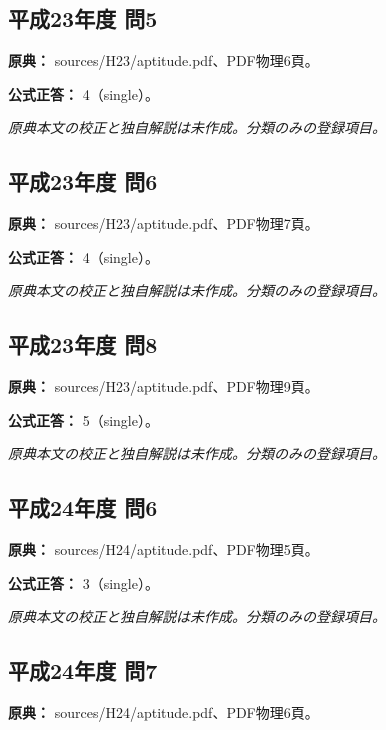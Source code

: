 \subsection{平成23年度 問5}
\label{q:h23-reg-apt-05}

\noindent\textbf{原典：} sources/H23/aptitude.pdf、PDF物理6頁。

\textbf{公式正答：} 4（single）。

\par\textit{原典本文の校正と独自解説は未作成。分類のみの登録項目。}

\subsection{平成23年度 問6}
\label{q:h23-reg-apt-06}

\noindent\textbf{原典：} sources/H23/aptitude.pdf、PDF物理7頁。

\textbf{公式正答：} 4（single）。

\par\textit{原典本文の校正と独自解説は未作成。分類のみの登録項目。}

\subsection{平成23年度 問8}
\label{q:h23-reg-apt-08}

\noindent\textbf{原典：} sources/H23/aptitude.pdf、PDF物理9頁。

\textbf{公式正答：} 5（single）。

\par\textit{原典本文の校正と独自解説は未作成。分類のみの登録項目。}

\subsection{平成24年度 問6}
\label{q:h24-reg-apt-06}

\noindent\textbf{原典：} sources/H24/aptitude.pdf、PDF物理5頁。

\textbf{公式正答：} 3（single）。

\par\textit{原典本文の校正と独自解説は未作成。分類のみの登録項目。}

\subsection{平成24年度 問7}
\label{q:h24-reg-apt-07}

\noindent\textbf{原典：} sources/H24/aptitude.pdf、PDF物理6頁。

